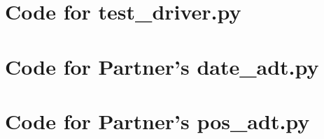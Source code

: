 \documentclass[12pt]{article}
\begin{document}
\noindent 

\newpage

\section{Code for test\_driver.py}

\noindent 

\newpage

\section{Code for Partner's date\_adt.py}

\noindent 

\section{Code for Partner's pos\_adt.py}

\noindent 
\end{document}
